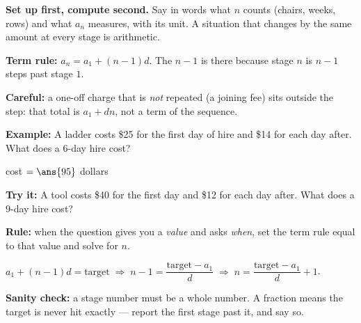 \documentclass[12pt]{article}
\begin{document}


\begin{formulabox}
\textbf{Set up first, compute second.} Say in words what $n$ counts (chairs, weeks, rows) and what $a_n$ measures, with its unit. A situation that changes by the same amount at every stage is arithmetic.\par
\textbf{Term rule:} $a_n = a_1 + (n-1)d$. The $n-1$ is there because stage $n$ is $n-1$ steps past stage $1$.\par
\textbf{Careful:} a one-off charge that is \emph{not} repeated (a joining fee) sits outside the step: that total is $a_1 + dn$, not a term of the sequence.
\end{formulabox}

\begin{examplebox}
\textbf{Example:} \quad A ladder costs \$25 for the first day of hire and \$14 for each day after. What does a $6$-day hire cost?

cost $= \ans{95}$ dollars
\end{examplebox}

\begin{tryitbox}
\textbf{Try it:} \quad A tool costs \$40 for the first day and \$12 for each day after. What does a $9$-day hire cost?\\[2pt]
\end{tryitbox}


\begin{formulabox}
\textbf{Rule:} when the question gives you a \emph{value} and asks \emph{when}, set the term rule equal to that value and solve for $n$.\par
$a_1 + (n-1)d = \text{target} \;\Longrightarrow\; n - 1 = \dfrac{\text{target} - a_1}{d} \;\Longrightarrow\; n = \dfrac{\text{target} - a_1}{d} + 1$.\par
\textbf{Sanity check:} a stage number must be a whole number. A fraction means the target is never hit exactly --- report the first stage past it, and say so.
\end{formulabox}
\end{document}
